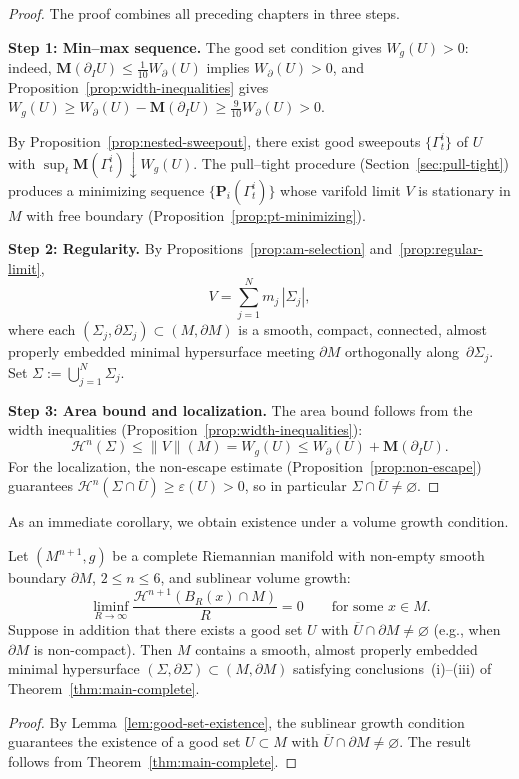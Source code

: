 \begin{proof}
The proof combines all preceding chapters in three steps.

\medskip
\noindent\textbf{Step 1: Min--max sequence.}
The good set condition gives $W_g(U) > 0$: indeed, $\mathbf{M}(\partial_I U) \leq \frac{1}{10} W_\partial(U)$ implies $W_\partial(U) > 0$, and Proposition~\ref{prop:width-inequalities} gives $W_g(U) \geq W_\partial(U) - \mathbf{M}(\partial_I U) \geq \frac{9}{10} W_\partial(U) > 0$.

By Proposition~\ref{prop:nested-sweepout}, there exist good sweepouts $\{\Gamma_t^i\}$ of $U$ with $\sup_t\mathbf{M}(\Gamma_t^i)\downarrow W_g(U)$. The pull--tight procedure (Section~\ref{sec:pull-tight}) produces a minimizing sequence $\{\mathbf{P}_i(\Gamma_t^i)\}$ whose varifold limit $V$ is stationary in $M$ with free boundary (Proposition~\ref{prop:pt-minimizing}).

\medskip
\noindent\textbf{Step 2: Regularity.}
By Propositions~\ref{prop:am-selection} and~\ref{prop:regular-limit},
\[
V=\sum_{j=1}^N m_j\,|\Sigma_j|,
\]
where each $(\Sigma_j,\partial\Sigma_j)\subset(M,\partial M)$ is a smooth, compact, connected, almost properly embedded minimal hypersurface meeting $\partial M$ orthogonally along~$\partial\Sigma_j$. Set $\Sigma:=\bigcup_{j=1}^N\Sigma_j$.

\medskip
\noindent\textbf{Step 3: Area bound and localization.}
The area bound follows from the width inequalities (Proposition~\ref{prop:width-inequalities}):
\[
\mathcal{H}^n(\Sigma)\le\|V\|(M)=W_g(U)\le W_\partial(U)+\mathbf{M}(\partial_IU).
\]
For the localization, the non-escape estimate (Proposition~\ref{prop:non-escape}) guarantees $\mathcal{H}^n(\Sigma\cap \overline{U})\ge\varepsilon(U)>0$, so in particular $\Sigma\cap\overline{U}\neq\varnothing$.
\end{proof}

As an immediate corollary, we obtain existence under a volume growth condition.

\begin{corollary}\label{cor:sublinear-existence}
Let $(M^{n+1},g)$ be a complete Riemannian manifold with non-empty smooth boundary $\partial M$, $2\le n\le 6$, and sublinear volume growth:
\[
\liminf_{R\to\infty}\frac{\mathcal{H}^{n+1}(B_R(x)\cap M)}{R}=0\qquad\text{for some }x\in M.
\]
Suppose in addition that there exists a good set $U$ with $\overline{U}\cap\partial M\neq\varnothing$ (e.g., when $\partial M$ is non-compact). Then $M$ contains a smooth, almost properly embedded minimal hypersurface $(\Sigma,\partial\Sigma)\subset(M,\partial M)$ satisfying conclusions~\textup{(i)--(iii)} of Theorem~\ref{thm:main-complete}.
\end{corollary}

\begin{proof}
By Lemma~\ref{lem:good-set-existence}, the sublinear growth condition guarantees the existence of a good set $U\subset M$ with $\overline{U}\cap\partial M\neq\varnothing$. The result follows from Theorem~\ref{thm:main-complete}.
\end{proof}
